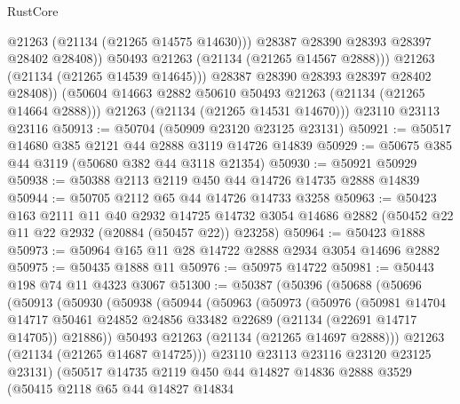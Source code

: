 \begin{lexlean}{RustCore}
\begin{coremodule}
                    @21263
                    (@21134 (@21265 @14575 @14630)))
                  @28387
                  @28390
                  @28393
                  @28397
                  @28402
                  @28408))
              @50493
              @21263
              (@21134 (@21265 @14567 @2888)))
            @21263
            (@21134 (@21265 @14539 @14645)))
          @28387
          @28390
          @28393
          @28397
          @28402
          @28408))
      (@50604 @14663 @2882 @50610 @50493 @21263 (@21134 (@21265 @14664 @2888)))
      @21263
      (@21134 (@21265 @14531 @14670)))
    @23110
    @23113
    @23116
@50913 := @50704 (@50909 @23120 @23125 @23131)
@50921 := @50517 @14680 @385 @2121 @44 @2888 @3119 @14726 @14839
@50929 := @50675 @385 @44 @3119 (@50680 @382 @44 @3118 @21354)
@50930 := @50921 @50929
@50938 := @50388 @2113 @2119 @450 @44 @14726 @14735 @2888 @14839
@50944 := @50705 @2112 @65 @44 @14726 @14733 @3258
@50963 := @50423
    @163
    @2111
    @11
    @40
    @2932
    @14725
    @14732
    @3054
    @14686
    @2882
    (@50452 @22 @11 @22 @2932 (@20884 (@50457 @22)) @23258)
@50964 := @50423 @1888
@50973 := @50964 @165 @11 @28 @14722 @2888 @2934 @3054 @14696 @2882
@50975 := @50435 @1888 @11
@50976 := @50975 @14722
@50981 := @50443 @198 @74 @11 @4323 @3067
@51300 := @50387
    (@50396
      (@50688
        (@50696
          (@50913
            (@50930
              (@50938
                (@50944
                  (@50963
                    (@50973
                      (@50976
                        (@50981
                          @14704
                          @14717
                          @50461
                          @24852
                          @24856
                          @33482
                          @22689
                          (@21134 (@22691 @14717 @14705))
                          @21886))
                      @50493
                      @21263
                      (@21134 (@21265 @14697 @2888)))
                    @21263
                    (@21134 (@21265 @14687 @14725)))
                  @23110
                  @23113
                  @23116
                  @23120
                  @23125
                  @23131)
                (@50517
                  @14735
                  @2119
                  @450
                  @44
                  @14827
                  @14836
                  @2888
                  @3529
                  (@50415
                    @2118
                    @65
                    @44
                    @14827
                    @14834

\end{coremodule}
\end{lexlean}
